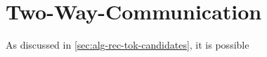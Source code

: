 \chapter{Two-Way-Communication}
\label{chap:twowaycommunication}

As discussed in \autoref{sec:alg-rec-tok-candidates}, it is possible 

